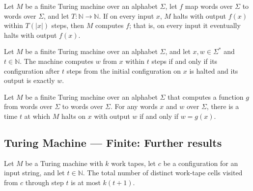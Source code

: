\begin{theorem}
\label{Turing.FinTM.ComputesFunInTime.computes}
\leanok
{}
Let $M$ be a finite Turing machine over an alphabet $\Sigma$, let $f$ map words over
$\Sigma$ to words over $\Sigma$, and let $T:\mathbb{N}\to\mathbb{N}$. If on every input
$x$, $M$ halts with output $f(x)$ within $T(|x|)$ steps, then $M$ computes $f$; that is,
on every input it eventually halts with output $f(x)$.
\end{theorem}

\begin{theorem}
\label{Turing.FinTM.computesInTime_iff}
\leanok
{}
Let $M$ be a finite Turing machine over an alphabet $\Sigma$, and let $x,w\in\Sigma^*$
and $t\in\mathbb{N}$. The machine computes $w$ from $x$ within $t$ steps if and only if
its configuration after $t$ steps from the initial configuration on $x$ is halted and
its output is exactly $w$.
\end{theorem}

\begin{theorem}
\label{Turing.FinTM.Computes.exists_computesInTime_iff}
\leanok
{}
Let $M$ be a finite Turing machine over an alphabet $\Sigma$ that computes a function
$g$ from words over $\Sigma$ to words over $\Sigma$. For any words $x$ and $w$ over
$\Sigma$, there is a time $t$ at which $M$ halts on $x$ with output $w$ if and only if
$w=g(x)$.
\end{theorem}

\subsection*{Turing Machine --- Finite: Further results}

\begin{theorem}
\label{Turing.MultiTapeTM.spaceUsed_le_mul_succ}
\leanok
{}
Let $M$ be a Turing machine with $k$ work tapes, let $c$ be a configuration for an input
string, and let $t\in\mathbb{N}$. The total number of distinct work-tape cells visited
from $c$ through step $t$ is at most $k(t+1)$.
\end{theorem}

